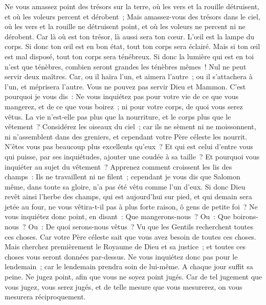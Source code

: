 \begin{multicols}{2}
Ne vous amassez point des trésors sur la terre, où les vers et la rouille détruisent, et où les voleurs percent et dérobent~;
Mais amassez-vous des trésors dans le ciel, où les vers et la rouille ne détruisent point, et où les voleurs ne percent ni ne dérobent.
Car là où est ton trésor, là aussi sera ton cœur.
L'œil est la lampe du corps. Si donc ton œil est en bon état, tout ton corps sera éclairé.
Mais si ton œil est mal disposé, tout ton corps sera ténébreux. Si donc la lumière qui est en toi n'est que ténèbres, combien seront grandes les ténèbres mêmes~!
Nul ne peut servir deux maîtres. Car, ou il haïra l'un, et aimera l'autre~; ou il s'attachera à l'un, et méprisera l'autre. Vous ne pouvez pas servir Dieu et Mammon.
C'est pourquoi je vous dis~: Ne vous inquiétez pas pour votre vie de ce que vous mangerez, et de ce que vous boirez~; ni pour votre corps, de quoi vous serez vêtus. La vie n'est-elle pas plus que la nourriture, et le corps plus que le vêtement~?
Considérez les oiseaux du ciel~; car ils ne sèment ni ne moissonnent, ni n'assemblent dans des greniers, et cependant votre Père céleste les nourrit. N'êtes vous pas beaucoup plus excellents qu'eux~?
Et qui est celui d'entre vous qui puisse, par ses inquiétudes, ajouter une coudée à sa taille~?
Et pourquoi vous inquiéter au sujet du vêtement~? Apprenez comment croissent les lis des champs~: Ils ne travaillent ni ne filent~;
cependant je vous dis que Salomon même, dans toute sa gloire, n'a pas été vêtu comme l'un d'eux.
Si donc Dieu revêt ainsi l'herbe des champs, qui est aujourd'hui sur pied, et qui demain sera jetée au four, ne vous vêtira-t-il pas à plus forte raison, ô gens de petite foi~?
Ne vous inquiétez donc point, en disant~: Que mangerons-nous~? Ou~: Que boirons-nous~? Ou~: De quoi serons-nous vêtus~?
Vu que les Gentils recherchent toutes ces choses. Car votre Père céleste sait que vous avez besoin de toutes ces choses.
Mais cherchez premièrement le Royaume de Dieu et sa justice~; et toutes ces choses vous seront données par-dessus.
Ne vous inquiétez donc pas pour le lendemain~; car le lendemain prendra soin de lui-même. A chaque jour suffit sa peine.
\VerseOne{}Ne jugez point, afin que vous ne soyez point jugés.
Car de tel jugement que vous jugez, vous serez jugés, et de telle mesure que vous mesurerez, on vous mesurera réciproquement.

\end{multicols}
